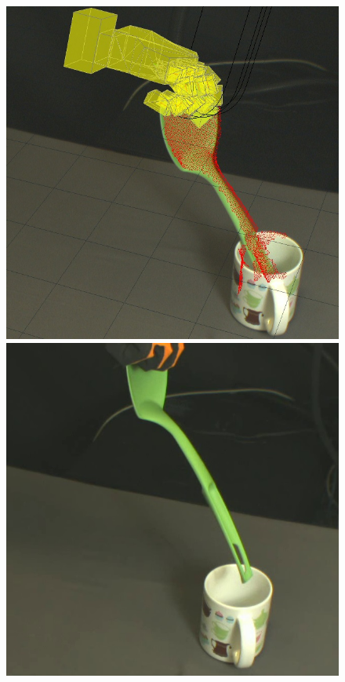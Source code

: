 \begin{figure}
\begin{center}
  \includegraphics[width=\tw]{images/experiments/query/spatula-1-s}
 \includegraphics[width=\tw]{images/experiments/exec/spatula-s}

\end{center}
\end{figure}
